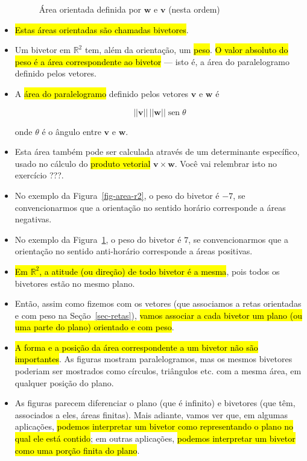 \documentclass[
  letterpaper,
  DIV=11,
  numbers=noendperiod]{scrreprt}
\DeclareMathOperator{\sen}{\text{sen}}
\begin{document}
\begin{itemize}
\begin{figure}[t]
{  }

  \caption{\label{fig-area-r2-2}Área orientada definida por $\mathbf{w}$
  e $\mathbf{v}$ (nesta ordem)}

  \end{figure}
\item
  {\hl{Estas áreas orientadas são chamadas bivetores}}.
\item
  Um bivetor em $\mathbb{R}^2$ tem, além da orientação, um {\hl{peso}}.
  {\hl{O valor absoluto do peso é a área correspondente ao bivetor}} ---
  isto é, a área do paralelogramo definido pelos vetores.
\item
  A {\hl{área do paralelogramo}} definido pelos vetores $\mathbf{v}$ e
  $\mathbf{w}$ é

  \[
  ||\mathbf{v}||\, ||\mathbf{w}|| \sen \theta
  \]

  onde $\theta$ é o ângulo entre $\mathbf{v}$ e $\mathbf{w}$.
\item
  Esta área também pode ser calculada através de um determinante
  específico, usado no cálculo do {\hl{produto vetorial}}
  $\mathbf{v} \times \mathbf{w}$. Você vai relembrar isto no exercício
  ???.
\item
  No exemplo da Figura~\ref{fig-area-r2}, o peso do bivetor é $-7$, se
  convencionarmos que a orientação no sentido horário corresponde a
  áreas negativas.
\item
  No exemplo da Figura~\ref{fig-area-r2-2}, o peso do bivetor é $7$, se
  convencionarmos que a orientação no sentido anti-horário corresponde a
  áreas positivas.
\item
  {\hl{Em $\mathbb{R}^2$, a atitude (ou direção) de todo bivetor é a
  mesma}}, pois todos os bivetores estão no mesmo plano.
\item
  Então, assim como fizemos com os vetores (que associamos a retas
  orientadas e com peso na Seção~\ref{sec-retas}), {\hl{vamos associar a
  cada bivetor um plano (ou uma parte do plano) orientado e com peso}}.
\item
  {\hl{A forma e a posição da área correspondente a um bivetor não são
  importantes}}. As figuras mostram paralelogramos, mas os mesmos
  bivetores poderiam ser mostrados como círculos, triângulos etc. com a
  mesma área, em qualquer posição do plano.
\item
  As figuras parecem diferenciar o plano (que é infinito) e bivetores
  (que têm, associados a eles, áreas finitas). Mais adiante, vamos ver
  que, em algumas aplicações, {\hl{podemos interpretar um bivetor como
  representando o plano no qual ele está contido}}; em outras
  aplicações, {\hl{podemos interpretar um bivetor como uma porção finita
  do plano}}.


\end{itemize}
\end{document}
